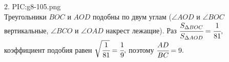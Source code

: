 2. {{PIC:g8-105.png}}\\
Треугольники $BOC$ и $AOD$ подобны по двум углам ($\angle AOD$ и $\angle BOC$ вертикальные, $\angle BCO$ и $\angle OAD$ накрест лежащие). Раз
$\cfrac{S_{\Delta BOC}}{S_{\Delta AOD}}=\cfrac{1}{81},$ коэффициент подобия равен $\sqrt{\cfrac{1}{81}}=\cfrac{1}{9},$ поэтому $\cfrac{AD}{BC}=9.$\\
